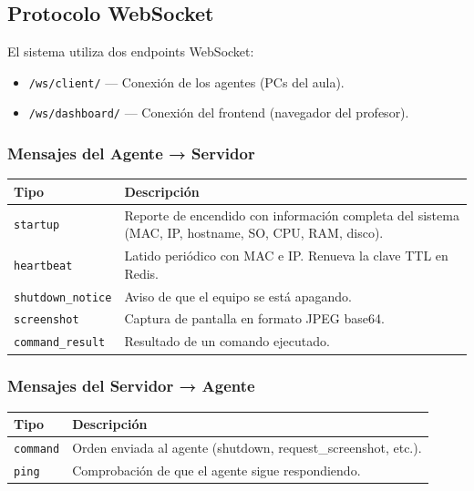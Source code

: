 \documentclass[12pt, a4paper, twoside]{article}
\begin{document}
\subsection{Protocolo WebSocket}

El sistema utiliza dos endpoints WebSocket:

\begin{itemize}
  \item \texttt{/ws/client/} — Conexión de los agentes (PCs del aula).
  \item \texttt{/ws/dashboard/} — Conexión del frontend (navegador del profesor).
\end{itemize}

\subsubsection{Mensajes del Agente → Servidor}

\begin{longtable}{lp{9cm}}
  \toprule
  \textbf{Tipo} & \textbf{Descripción} \\
  \midrule
  \texttt{startup} & Reporte de encendido con información completa del sistema (MAC, IP, hostname, SO, CPU, RAM, disco). \\
  \texttt{heartbeat} & Latido periódico con MAC e IP. Renueva la clave TTL en Redis. \\
  \texttt{shutdown\_notice} & Aviso de que el equipo se está apagando. \\
  \texttt{screenshot} & Captura de pantalla en formato JPEG base64. \\
  \texttt{command\_result} & Resultado de un comando ejecutado. \\
  \bottomrule
\end{longtable}

\subsubsection{Mensajes del Servidor → Agente}

\begin{longtable}{lp{9cm}}
  \toprule
  \textbf{Tipo} & \textbf{Descripción} \\
  \midrule
  \texttt{command} & Orden enviada al agente (shutdown, request\_screenshot, etc.). \\
  \texttt{ping} & Comprobación de que el agente sigue respondiendo. \\
  \bottomrule
\end{longtable}
\end{document}
